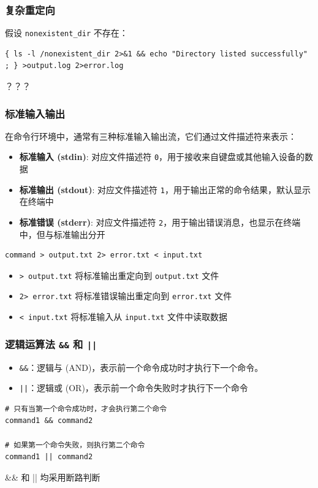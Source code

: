 \documentclass[UTF8, 16pt]{beamer}
\begin{document}
\begin{frame}[fragile]
    \frametitle{复杂重定向}
    \textcolor{sufered}{假设 \texttt{nonexistent\_dir} 不存在：}

    \begin{lstlisting}[numbers=none]
{ ls -l /nonexistent_dir 2>&1 && echo "Directory listed successfully" ; } >output.log 2>error.log\end{lstlisting}

    ？？？
\end{frame}

\begin{frame}[fragile]
    \frametitle{标准输入输出}

    在命令行环境中，通常有三种标准输入输出流，它们通过文件描述符来表示：

    \begin{itemize}
        \item \textbf{标准输入 (stdin)}: 对应文件描述符 \texttt{0}，用于接收来自键盘或其他输入设备的数据
        \item \textbf{标准输出 (stdout)}: 对应文件描述符 \texttt{1}，用于输出正常的命令结果，默认显示在终端中
        \item \textbf{标准错误 (stderr)}: 对应文件描述符 \texttt{2}，用于输出错误消息，也显示在终端中，但与标准输出分开
    \end{itemize}

    \begin{lstlisting}[numbers=none]
command > output.txt 2> error.txt < input.txt\end{lstlisting}
    \begin{itemize}
        \item \texttt{> output.txt} 将标准输出重定向到 \texttt{output.txt} 文件
        \item \texttt{2> error.txt} 将标准错误输出重定向到 \texttt{error.txt} 文件
        \item \texttt{< input.txt} 将标准输入从 \texttt{input.txt} 文件中读取数据
    \end{itemize}
\end{frame}

\begin{frame}[fragile]
    \frametitle{逻辑运算法 \texttt{\&\&} 和 \texttt{||}}

    \begin{itemize}
        \item \texttt{\&\&}：逻辑与 (AND)，表示前一个命令成功时才执行下一个命令。
        \item \texttt{||}：逻辑或 (OR)，表示前一个命令失败时才执行下一个命令
    \end{itemize}

    \begin{lstlisting}
# 只有当第一个命令成功时，才会执行第二个命令
command1 && command2

# 如果第一个命令失败，则执行第二个命令
command1 || command2\end{lstlisting}
    \&\& 和 || 均采用断路判断
\end{frame}
\end{document}
